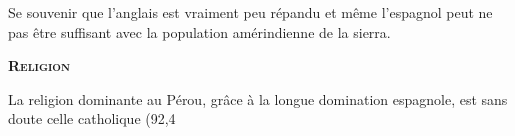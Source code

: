 \begin{multicols}{2}
Se souvenir que l'anglais est vraiment peu répandu et même l'espagnol peut ne pas être suffisant avec la population amérindienne de la sierra.

\textbf{\textsc{Religion}}

La religion dominante au Pérou, grâce à la longue domination espagnole, est sans doute celle catholique (92,4%

\end{multicols}


